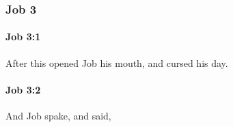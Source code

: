 	\subsubsection{Job 3} %
		\label{JOB-3}

		\paragraph{Job 3:1} %
			\label{JOB-3-1}

			After this opened Job his mouth, and cursed his day.


		\paragraph{Job 3:2} %
			\label{JOB-3-2}

			And Job spake, and said,


